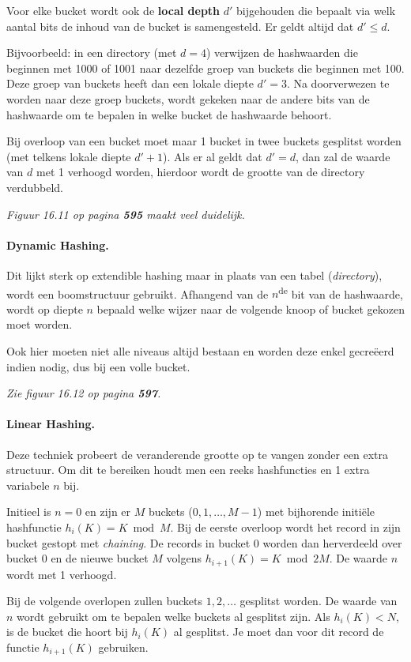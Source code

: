 Voor elke bucket wordt ook de \textbf{local depth} $d'$ bijgehouden die bepaalt via welk aantal bits de inhoud van de bucket is samengesteld. Er geldt altijd dat $d' \leqslant d$.

Bijvoorbeeld: in een directory (met $d=4$) verwijzen de hashwaarden die beginnen met 1000 of 1001 naar dezelfde groep van buckets die beginnen met 100. Deze groep van buckets heeft dan een lokale diepte $d'=3$. Na doorverwezen te worden naar deze groep buckets, wordt gekeken naar de andere bits van de hashwaarde om te bepalen in welke bucket de hashwaarde behoort.

Bij overloop van een bucket moet maar 1 bucket in twee buckets gesplitst worden (met telkens lokale diepte $d'+1$). Als er al geldt dat $d' = d$, dan zal de waarde van $d$ met 1 verhoogd worden, hierdoor wordt de grootte van de directory verdubbeld.

\textit{Figuur 16.11 op pagina \textbf{595} maakt veel duidelijk.}

\paragraph{Dynamic Hashing.}
Dit lijkt sterk op extendible hashing maar in plaats van een tabel (\textit{directory}), wordt een boomstructuur gebruikt. Afhangend van de $n$\textsuperscript{de} bit van de hashwaarde, wordt op diepte $n$ bepaald welke wijzer naar de volgende knoop of bucket gekozen moet worden.

Ook hier moeten niet alle niveaus altijd bestaan en worden deze enkel gecre\"eerd indien nodig, dus bij een volle bucket.

\textit{Zie figuur 16.12 op pagina \textbf{597}.}

\paragraph{Linear Hashing.}
Deze techniek probeert de veranderende grootte op te vangen zonder een extra structuur. Om dit te bereiken houdt men een reeks hashfuncties en 1 extra variabele $n$ bij.

Initieel is $n=0$ en zijn er $M$ buckets ($0,1,\dots,M-1$) met bijhorende initi\"ele hashfunctie $h_i(K) = K \bmod M$. Bij de eerste overloop wordt het record in zijn bucket gestopt met \textit{chaining}. De records in bucket 0 worden dan herverdeeld over bucket 0 en de nieuwe bucket $M$ volgens $h_{i+1}(K) = K \bmod 2M$. De waarde $n$ wordt met 1 verhoogd.

Bij de volgende overlopen zullen buckets $1,2,\dots$ gesplitst worden. De waarde van $n$ wordt gebruikt om te bepalen welke buckets al gesplitst zijn. Als $h_i(K) < N$, is de bucket die hoort bij $h_i(K)$ al gesplitst. Je moet dan voor dit record de functie $h_{i+1}(K)$ gebruiken.

